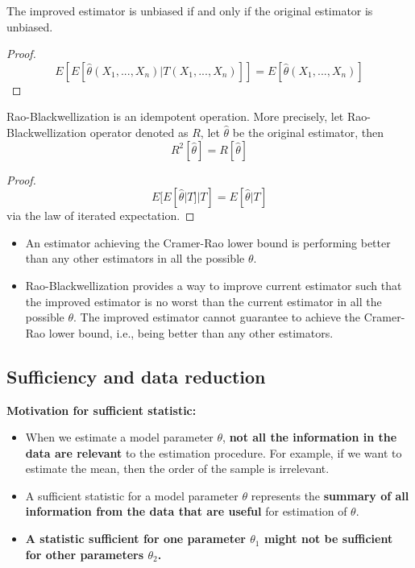 \begin{refsection}
\begin{lemma}
The improved estimator is unbiased if and only if the original estimator is unbiased. 	
\end{lemma}
\begin{proof}
	$$E[E[\hat{\theta}(X_1,...,X_n)|T(X_1,...,X_n)]]=E[\hat{\theta}(X_1,...,X_n)]$$
\end{proof}


\begin{lemma}
Rao-Blackwellization is an idempotent operation. More precisely, let Rao-Blackwellization operator denoted as $R$, let $\hat{\theta}$ be the original estimator, then
$$R^2[\hat{\theta}] = R[\hat{\theta}]$$	
\end{lemma}
\begin{proof}
		$$E[E[\hat{\theta}|T]|T]=E[\hat{\theta}|T]$$
		via the law of iterated expectation.
\end{proof}


\begin{remark}\hfill
\begin{itemize}
	\item An estimator achieving the Cramer-Rao lower bound is performing better than any other estimators in all the possible $\theta$.
	\item Rao-Blackwellization provides a way to improve current estimator such that the improved estimator is no worst than the current estimator in all the possible $\theta$. The improved estimator cannot guarantee to achieve the Cramer-Rao lower bound, i.e., being better than any other estimators. 
\end{itemize}
\end{remark}


\subsection{Sufficiency and data reduction}

\begin{mdframed}
\textbf{Motivation for sufficient statistic:}\\
	\begin{itemize}
		\item When we estimate a model parameter $\theta$, \textbf{not all the information in the data are relevant} to the estimation procedure. For example, if we want to estimate the mean, then the order of the sample is irrelevant.
		\item A sufficient statistic for a model parameter $\theta$ represents the \textbf{summary of all information from the data that are useful} for estimation of $\theta$.
		\item \textbf{A statistic sufficient for one parameter $\theta_1$ might not be sufficient for other parameters $\theta_2$.}
	\end{itemize}
\end{mdframed}



\end{refsection}
